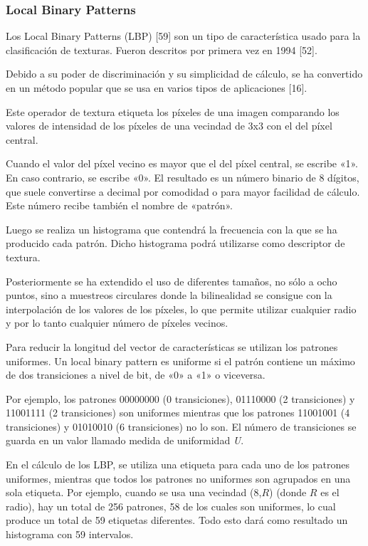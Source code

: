 \subsubsection*{Local Binary Patterns}
Los Local Binary Patterns (LBP) [59] son un tipo de característica usado para la clasificación
de texturas. Fueron descritos por primera vez en 1994 [52].

Debido a su poder de discriminación y su simplicidad de cálculo, se ha convertido en un método popular que se usa en varios tipos de aplicaciones [16].

Este operador de textura etiqueta los píxeles de una imagen comparando los valores de intensidad de los píxeles de una vecindad de 3x3 con el del píxel central.

Cuando el valor del píxel vecino es mayor que el del píxel central, se escribe «1». En caso contrario, se escribe «0». El resultado es un número binario de 8 dígitos, que suele convertirse a decimal por comodidad o para mayor facilidad de cálculo. Este número recibe también el nombre de «patrón».

Luego se realiza un histograma que contendrá la frecuencia con la que se ha producido cada patrón. Dicho histograma podrá utilizarse como descriptor de textura.

Posteriormente se ha extendido el uso de diferentes tamaños, no sólo a ocho puntos, sino a muestreos circulares donde la bilinealidad se consigue con la interpolación de los valores de los píxeles, lo que permite utilizar cualquier radio y por lo tanto cualquier número de píxeles vecinos.

Para reducir la longitud del vector de características se utilizan los patrones uniformes. Un local binary pattern es uniforme si el patrón contiene un máximo de dos transiciones a nivel de bit, de «0» a «1» o viceversa.


Por ejemplo, los patrones 00000000 (0 transiciones), 01110000 (2 transiciones) y 11001111 (2 transiciones) son uniformes mientras que los patrones 11001001 (4 transiciones) y 01010010 (6 transiciones) no lo son. El número de transiciones se guarda en un valor llamado medida de uniformidad \textit{U}.

En el cálculo de los LBP, se utiliza una etiqueta para cada uno de los patrones uniformes, mientras que todos los patrones no uniformes son agrupados en una sola etiqueta. Por ejemplo, cuando se usa una vecindad (8,$R$) (donde $R$ es el radio), hay un total de 256 patrones, 58 de los cuales son uniformes, lo cual produce un total de 59 etiquetas diferentes. Todo esto dará como resultado un histograma con 59 intervalos.
\newpage

